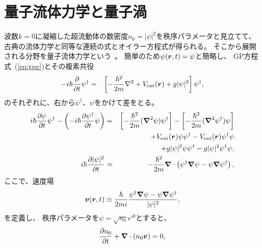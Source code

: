 \documentclass[12pt,a4paper]{jbook}
\def\Vec#1{\mbox{\boldmath $#1$}}			%
\begin{document}
		\section{量子流体力学と量子渦}
		波数$k=0$に凝縮した超流動体の数密度$n_0=|\psi|^2$を秩序パラメータと見立てて、
		古典の流体力学と同等な連続の式とオイラー方程式が得られる。
        そこから展開される分野を量子流体力学という~\cite{quantumfluid}。
        簡単のため$\psi(\Vec{r},t)=\psi$と簡略し、
        GP方程式~(\ref{eq:gpe})とその複素共役
        \begin{eqnarray}
            \label{eq:ccgpe}
			-i \hbar \frac{\partial}{\partial t} \psi^\dagger & = &
            \left[
			-\frac{\hbar^2}{2m} \nabla^2
            + V_{\rm ext}(\Vec{r})
			+ g|\psi|^2
            \right]\psi^\dagger,
        \end{eqnarray}
        のそれぞれに、右から$\psi^\dagger$、$\psi$をかけて差をとる。
        \begin{eqnarray}
            i \hbar \frac{\partial \psi}{\partial t}\psi^\dagger
            - \left(
                -i \hbar \frac{\partial \psi^\dagger}{\partial t}\psi
            \right)
            & = &
            \left[ - \frac{\hbar^2}{2m} ( \Vec{\nabla}^2 \psi ) \psi^\dagger \right]
            - \left[ - \frac{\hbar^2}{2m} ( \Vec{\nabla}^2 \psi^\dagger ) \psi \right] \nonumber
            \\
            & & + V_{\rm ext}(\Vec{r}) \psi \psi^\dagger - V_{\rm ext}(\Vec{r}) \psi^\dagger \psi \nonumber
            \\
            & & + g|\psi|^2 \psi \psi^\dagger - g|\psi|^2 \psi^\dagger \psi, \nonumber
            \\
            i \hbar \frac{\partial |\psi|^2}{\partial t} & = & - \frac{\hbar^2}{2m} \Vec{\nabla} \cdot 
            \left(
                \psi^\dagger \Vec{\nabla} \psi - \psi \Vec{\nabla} \psi^\dagger
            \right),
        \end{eqnarray}
        ここで、速度場
        \begin{eqnarray}
            \label{eq:vfld}
            \Vec{v}(\Vec{r},t) \equiv \frac{\hbar}{2mi} \frac{\psi^\dagger \Vec{\nabla} \psi - \psi \Vec{\nabla} \psi^\dagger}{|\psi|^2},
        \end{eqnarray}
        を定義し、
        秩序パラメータを$\psi=\sqrt{n_0}e^{i \theta}$とすると、
        \begin{eqnarray}
            \label{eq:qcont}
            \frac{\partial n_0}{\partial t} + \Vec{\nabla} \cdot (n_0 \Vec{v}) = 0,
        \end{eqnarray}
\end{document}
